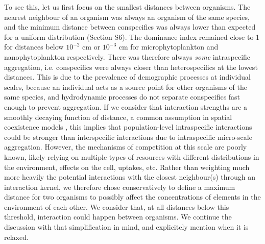 \documentclass[english]{article}
\begin{document}
To see this, let us first focus on the smallest distances between
organisms. The nearest neighbour of an organism was always an organism
of the same species, and the minimum distance between conspecifics
was always lower than expected for a uniform distribution (Section
S6). The dominance index remained close to 1 for distances below $10^{-2}$
cm or $10^{-3}$ cm for microphytoplankton and nanophytoplankton respectively.
There was therefore always \emph{some} intraspecific aggregation,
i.e. conspecifics were always closer than heterospecifics at the lowest
distances. This is due to the prevalence of demographic processes
at individual scales, because an individual acts as a source point
for other organisms of the same species, and hydrodynamic processes
do not separate conspecifics fast enough to prevent aggregation. If
we consider that interaction strengths are a smoothly decaying function
of distance, a common assumption in spatial coexistence models \citep[e.g., ][]{bolker_spatial_1999,law_population_2003},
this implies that population-level intraspecific interactions could
be stronger than interspecific interactions due to intraspecific micro-scale
aggregation. However, the mechanisms of competition at this scale
are poorly known, likely relying on multiple types of resources with
different distributions in the environment, effects on the cell, uptakes,
etc. Rather than weighting much more heavily the potential interactions
with the closest neighbour(s) through an interaction kernel, we therefore
chose conservatively to define a maximum distance for two organisms
to possibly affect the concentrations of elements in the environment
of each other. We consider that, at all distances below this threshold,
interaction could happen between organisms. We continue the discussion
with that simplification in mind, and explicitely mention when it
is relaxed.
\end{document}
